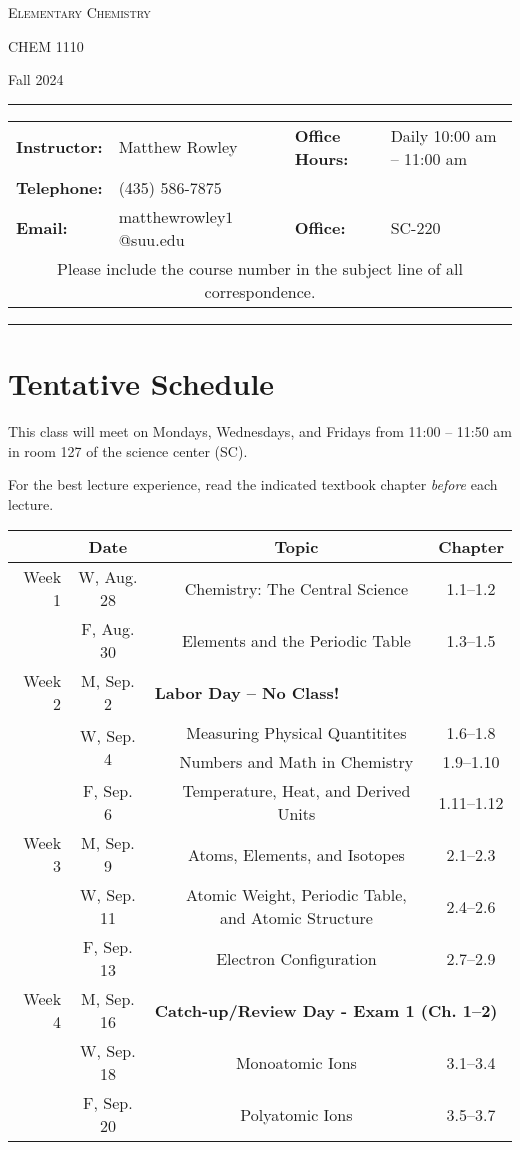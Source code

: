\documentclass[12pt, letterpaper]{article}
\begin{document}
\begin{center}
	{\Large \textsc{Elementary Chemistry}}
	
	CHEM 1110
\end{center}
\begin{center}
	{\large Fall 2024}
\end{center}
\begin{center}
	\rule{0.99\textwidth}{0.4pt}
	\begin{tabular}{llcll}
		\textbf{Instructor:} & Matthew Rowley           &  & \textbf{Office Hours:} & Daily 10:00 am -- 11:00 am \\
		\textbf{Telephone:}  & (435) 586-7875           &  &                        &  \\
		\textbf{Email:}      & matthewrowley$1$@suu.edu &  & \textbf{Office:}       & SC-220                   \\
		\multicolumn{5}{c}{Please include the course number in the subject line of all correspondence.}
	\end{tabular}
	\rule{0.99\textwidth}{0.4pt}
\end{center}

\section*{Tentative Schedule}
This class will meet on Mondays, Wednesdays, and Fridays from 11:00  -- 11:50 am in room 127 of the science center (SC).


\noindent For the best lecture experience, read the indicated textbook chapter \emph{before} each lecture.

\noindent
\begin{tabular}{rcccc}
& Date && Topic & Chapter\\
\midrule
Week 1 & W, Aug. 28&& Chemistry: The Central Science & 1.1--1.2\\
& F, Aug. 30&& Elements and the Periodic Table & 1.3--1.5\\
\midrule
Week 2 & M, Sep. 2& \multicolumn{3}{l}{\textbf{Labor Day -- No Class!}}\\
& \multirow{2}{*}{W, Sep. 4}& & Measuring Physical Quantitites & 1.6--1.8\\
& & & Numbers and Math in Chemistry & 1.9--1.10\\
& F, Sep. 6&& Temperature, Heat, and Derived Units & 1.11--1.12\\
\midrule
Week 3 & M, Sep. 9&& Atoms, Elements, and Isotopes & 2.1--2.3\\
& W, Sep. 11&& Atomic Weight, Periodic Table, and Atomic Structure & 2.4--2.6\\
& F, Sep. 13&& Electron Configuration & 2.7--2.9\\
\midrule
Week 4 & M, Sep. 16& \multicolumn{3}{l}{\textbf{Catch-up/Review Day - Exam 1 (Ch. 1--2)}}\\
& W, Sep. 18&& Monoatomic Ions & 3.1--3.4\\
& F, Sep. 20&& Polyatomic Ions & 3.5--3.7\\
\end{tabular}
\end{document}
